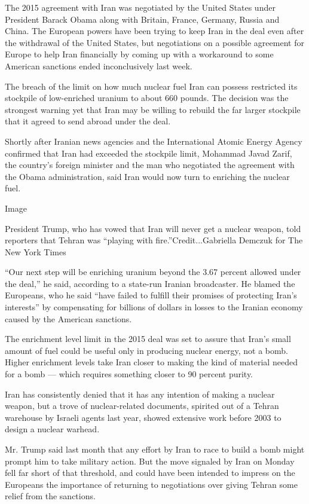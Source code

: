 The 2015 agreement with Iran was negotiated by the United States under
President Barack Obama along with Britain, France, Germany, Russia and
China. The European powers have been trying to keep Iran in the deal
even after the withdrawal of the United States, but negotiations on a
possible agreement for Europe to help Iran financially by coming up with
a workaround to some American sanctions ended inconclusively last week.

The breach of the limit on how much nuclear fuel Iran can possess
restricted its stockpile of low-enriched uranium to about 660 pounds.
The decision was the strongest warning yet that Iran may be willing to
rebuild the far larger stockpile that it agreed to send abroad under the
deal.

Shortly after Iranian news agencies and the International Atomic Energy
Agency confirmed that Iran had exceeded the stockpile limit, Mohammad
Javad Zarif, the country's foreign minister and the man who negotiated
the agreement with the Obama administration, said Iran would now turn to
enriching the nuclear fuel.

Image

President Trump, who has vowed that Iran will never get a nuclear
weapon, told reporters that Tehran was ``playing with
fire.''Credit...Gabriella Demczuk for The New York Times

``Our next step will be enriching uranium beyond the 3.67 percent
allowed under the deal,'' he said, according to a state-run Iranian
broadcaster. He blamed the Europeans, who he said ``have failed to
fulfill their promises of protecting Iran's interests'' by compensating
for billions of dollars in losses to the Iranian economy caused by the
American sanctions.

The enrichment level limit in the 2015 deal was set to assure that
Iran's small amount of fuel could be useful only in producing nuclear
energy, not a bomb. Higher enrichment levels take Iran closer to making
the kind of material needed for a bomb --- which requires something
closer to 90 percent purity.

Iran has consistently denied that it has any intention of making a
nuclear weapon, but a trove of nuclear-related documents, spirited out
of a Tehran warehouse by Israeli agents last year, showed extensive work
before 2003 to design a nuclear warhead.

Mr. Trump said last month that any effort by Iran to race to build a
bomb might prompt him to take military action. But the move signaled by
Iran on Monday fell far short of that threshold, and could have been
intended to impress on the Europeans the importance of returning to
negotiations over giving Tehran some relief from the sanctions.


